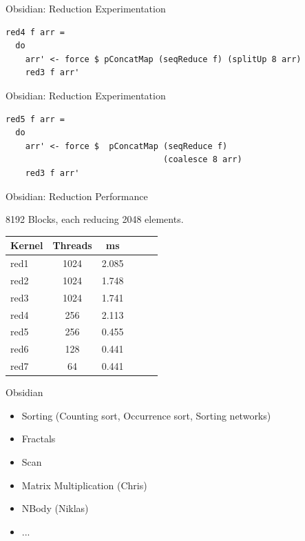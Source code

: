 \documentclass[xcolor=dvipsnames]{beamer}
\begin{document}
\begin{frame}[fragile]{Obsidian: Reduction Experimentation}

  \begin{block}{} 
    
\Fontvi
\begin{verbatim}
red4 f arr =
  do
    arr' <- force $ pConcatMap (seqReduce f) (splitUp 8 arr)
    red3 f arr' 
\end{verbatim} 
    
  \end{block}

\end{frame} 


\begin{frame}[fragile]{Obsidian: Reduction Experimentation}

  \begin{block}{} 
    
\Fontvi
\begin{verbatim}
red5 f arr =
  do
    arr' <- force $  pConcatMap (seqReduce f)
                                (coalesce 8 arr)
    red3 f arr' 
\end{verbatim} 
    
  \end{block}

\end{frame} 

\begin{frame}{Obsidian: Reduction Performance} 

8192 Blocks, each reducing 2048 elements. 

\begin{center}
\begin{tabular}{| l | c | c | c | c | r | }
\hline 
  Kernel & Threads & ms \\ \hline 
  red1 & 1024 & 2.085 \\ \hline
  red2 & 1024 & 1.748 \\ \hline
  red3 & 1024 & 1.741 \\ \hline
  red4 & 256 &  2.113  \\ \hline
  red5 & 256 &  0.455  \\ \hline
  red6 & 128 &  0.441  \\ \hline
  red7 & 64 &  0.441  \\ \hline
\end{tabular}
\end{center}
\end{frame} 

\begin{frame}{Obsidian} 

\begin{itemize} 
  \item Sorting (Counting sort, Occurrence sort, Sorting networks) 
  \item Fractals
  \item Scan 
  \item Matrix Multiplication (Chris)
  \item NBody (Niklas) 
  \item ... 
\end{itemize} 


\end{frame} 
\end{document}
